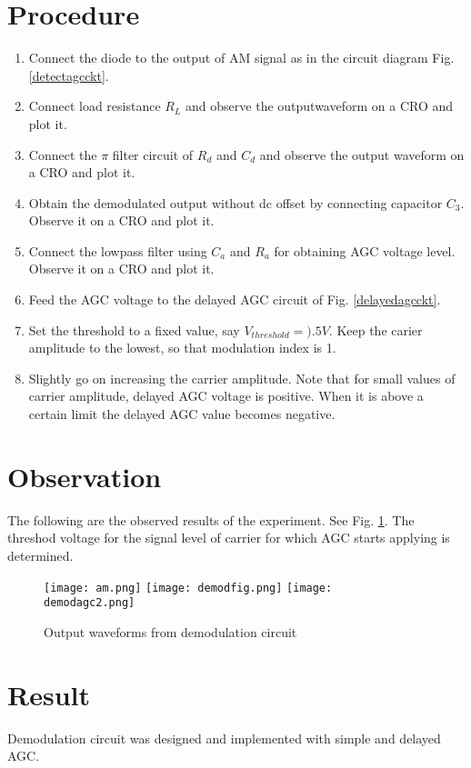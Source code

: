 \section*{Procedure}
\begin{enumerate}
\item
{Connect the diode to the output of AM signal as in the circuit diagram Fig. \ref{detectagcckt}.}
\item
Connect load resistance $R_L$ and observe the outputwaveform on a CRO and plot it.
\item
Connect the $\pi$ filter circuit of $R_d$ and $C_d$ and observe the output waveform on a CRO and plot it.
\item
Obtain the demodulated output without dc offset by connecting capacitor $C_3$. Observe it on a CRO and plot it.
\item
Connect the lowpass filter using $C_a$ and $R_a$ for obtaining AGC voltage level. Observe it on a CRO and plot it.
\item
Feed the AGC voltage to the delayed AGC	circuit of Fig. \ref{delayedagcckt}.
\item
Set the threshold to a fixed value, say $V_{threshold}=).5 V$. Keep the carier amplitude to the lowest, so that modulation index is 1.
\item
Slightly go on increasing the carrier amplitude. Note that for small values of carrier amplitude, delayed AGC voltage is positive. When it is above a certain limit the delayed AGC value becomes negative.
\end{enumerate}
\section*{Observation}
The following are the observed results of the experiment. See Fig. \ref{demodagcwaves}.
The threshod voltage for the signal level of carrier for which AGC starts applying is determined.
\begin{figure}
\texttt{[image: am.png]}
\texttt{[image: demodfig.png]}
\texttt{[image: demodagc2.png]}
\caption{Output waveforms from demodulation circuit}
\label{demodagcwaves}
\end{figure}

\section*{Result}

Demodulation circuit was designed and implemented with simple and delayed AGC.
